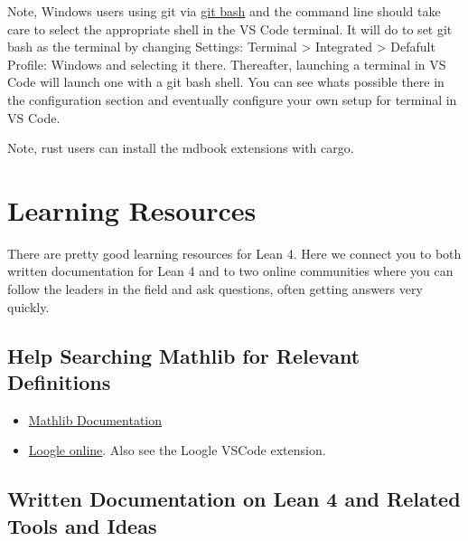 \documentclass{book}
\providecommand{\tightlist}{%
  \setlength{\itemsep}{0pt}\setlength{\parskip}{0pt}}
\begin{document}
Note, Windows users using git via \href{https://gitforwindows.org}{git bash} and the command line should take
care to select the appropriate shell in the VS Code terminal. It will do to
set git bash as the terminal by changing Settings: Terminal \textgreater{} Integrated \textgreater{}
Defafult Profile: Windows and selecting it there. Thereafter, launching a
terminal in VS Code will launch one with a git bash shell. You can see what\textquotesingle s
possible there in the configuration section and eventually configure your own
setup for terminal in VS Code.

Note, rust users can install the mdbook extensions with cargo.

\hypertarget{book__pandoc__debug__src__resources.md}{}
\hypertarget{book__pandoc__debug__src__resources.md__learning-resources}{%
\chapter*{Learning Resources}\label{book__pandoc__debug__src__resources.md__learning-resources}}

There are pretty good learning resources for Lean 4. Here we
connect you to both written documentation for Lean 4 and to two
online communities where you can follow the leaders in the field
and ask questions, often getting answers very quickly.

\hypertarget{book__pandoc__debug__src__resources.md__help-searching-mathlib-for-relevant-definitions}{%
\section*{Help Searching Mathlib for Relevant Definitions}\label{book__pandoc__debug__src__resources.md__help-searching-mathlib-for-relevant-definitions}}

\begin{itemize}
\tightlist
\item
  \href{https://leanprover-community.github.io/mathlib4_docs/index.html}{Mathlib Documentation}
\item
  \href{https://loogle.lean-lang.org/}{Loogle online}. Also see the Loogle VSCode extension.
\end{itemize}

\hypertarget{book__pandoc__debug__src__resources.md__written-documentation-on-lean-4-and-related-tools-and-ideas}{%
\section*{Written Documentation on Lean 4 and Related Tools and Ideas}\label{book__pandoc__debug__src__resources.md__written-documentation-on-lean-4-and-related-tools-and-ideas}}
\end{document}
